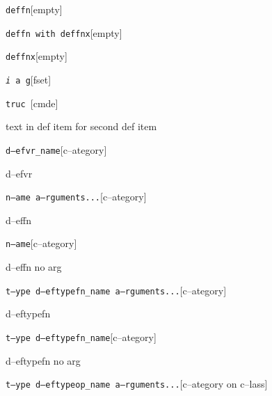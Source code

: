 \documentclass{book}
\begin{document}
\begin{titlepage}
%


\noindent\texttt\bgroup{}deffn\egroup{}\hfill[empty]



%

\noindent\texttt\bgroup{}deffn with deffnx\egroup{}\hfill[empty]



%
\noindent\texttt\bgroup{}deffnx\egroup{}\hfill[empty]



%

\noindent\texttt\bgroup{}\emph{i} a g\egroup{}\hfill[fset]



%
\noindent\texttt\bgroup{}truc \egroup{}\hfill[cmde]



%
text in def item for second def item


\noindent\texttt\bgroup{}d--efvr\_name\egroup{}\hfill[c--ategory]



%
d--efvr

\noindent\texttt\bgroup{}n--ame a--rguments...\egroup{}\hfill[c--ategory]



%
d--effn

\noindent\texttt\bgroup{}n--ame\egroup{}\hfill[c--ategory]



%
d--effn no arg

\noindent\texttt\bgroup{}t--ype d--eftypefn\_name a--rguments...\egroup{}\hfill[c--ategory]



%
d--eftypefn

\noindent\texttt\bgroup{}t--ype d--eftypefn\_name\egroup{}\hfill[c--ategory]



%
d--eftypefn no arg

\noindent\texttt\bgroup{}t--ype d--eftypeop\_name a--rguments...\egroup{}\hfill[c--ategory on c--lass]




\end{titlepage}
\end{document}
